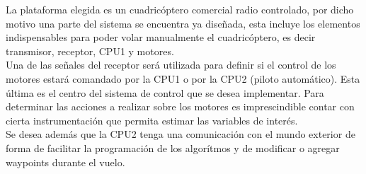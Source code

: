 \documentclass[main]{subfiles}
\begin{document}
La plataforma elegida es un cuadric\'optero comercial radio controlado, por dicho motivo una parte del sistema se encuentra ya diseñada, esta incluye los elementos indispensables para poder volar manualmente el cuadric\'optero, es decir transmisor, receptor, CPU1 y motores.\\   

Una de las señales del receptor ser\'a utilizada para definir si el control de los motores estar\'a comandado por la CPU1 o por la CPU2 (piloto autom\'atico). Esta \'ultima es el centro del sistema de control que se desea implementar. Para determinar las acciones a realizar sobre los motores es imprescindible contar con cierta instrumentaci\'on que permita estimar las variables de inter\'es.\\

Se desea adem\'as que la CPU2 tenga una comunicaci\'on con el mundo exterior de forma de facilitar la programaci\'on de los algor\'itmos y de modificar o agregar waypoints durante el vuelo.\\ 
\end{document}
